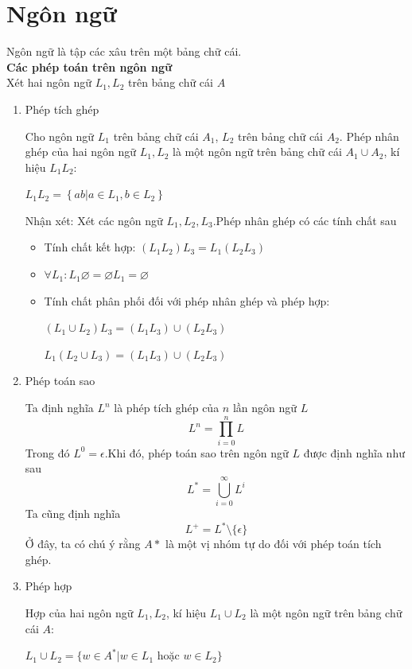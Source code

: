 \documentclass[14pt]{extreport}
\begin{document}
\section{Ngôn ngữ}
Ngôn ngữ là tập các xâu trên một bảng chữ cái.\\
\textbf{Các phép toán trên ngôn ngữ} \\
Xét hai ngôn ngữ $L_1,L_2$ trên bảng chữ cái $A$
\begin{enumerate}
\item Phép tích ghép

Cho ngôn ngữ $L_1$ trên bảng chữ cái $A_1$, $L_2$ trên bảng chữ cái $A_2$. Phép nhân ghép của hai ngôn ngữ $L_1,L_2$ là một ngôn ngữ trên bảng chữ cái $A_1 \cup A_2$, kí hiệu $L_1L_2$:
\begin{center}
$L_1L_2=\left\{ab|a\in L_1,b\in L_2\right\}$
\end{center}

Nhận xét: Xét các ngôn ngữ $L_1,L_2,L_3$.Phép nhân ghép có các tính chất sau
\begin{itemize}
\item Tính chất kết hợp: $\left(L_1 L_2 \right) L_3=L_1 \left(L_2 L_3 \right)$
\item $\forall L_1:L_1 \varnothing =\varnothing L_1=\varnothing$
\item Tính chất phân phối đối với phép nhân ghép và phép hợp:
\begin{center}
$\left(L_1\cup L_2\right) L_3=\left(L_1 L_3 \right)\cup \left(L_2  L_3\right)$

$L_1\left( L_2\cup L_3\right)=\left(L_1 L_3 \right)\cup \left(L_2 L_3\right)$

\end{center}
\end{itemize}

\item Phép toán sao

Ta định nghĩa $L^n$ là phép tích ghép của $n$ lần ngôn ngữ $L$
$$L^n = \prod_{i=0}^n L$$
Trong đó $L^0 = \epsilon$.Khi đó, phép toán sao trên ngôn ngữ $L$ được định nghĩa như sau
$$L^* = \bigcup_{i=0}^{\infty} L^i$$
Ta cũng định nghĩa
$$L^+ = L^* \setminus \{ \epsilon \}$$
Ở đây, ta có chú ý rằng $A*$ là một vị nhóm tự do đối với phép toán tích ghép.

\item Phép hợp

Hợp của hai ngôn ngữ $L_1,L_2$, kí hiệu $L_1\cup L_2$ là một ngôn ngữ trên bảng chữ cái $A$:

\begin{center}
$L_1\cup L_2=\{w\in A^*|w\in L_1$ hoặc $ w\in L_2\}$
\end{center}



\end{enumerate}
\end{document}
